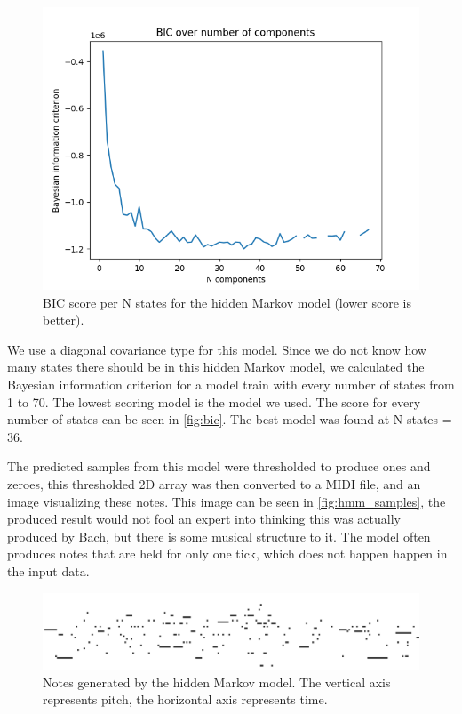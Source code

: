 \documentclass[11pt, twocolumn]{article}
\begin{document}
\begin{figure}[ht]
    \centering
    \includegraphics[width=\linewidth]{images/hmm_unfin_bic.png}
    \caption{BIC score per N states for the hidden Markov model (lower score is better).}
    \label{fig:bic}
\end{figure}

We use a diagonal covariance type for this model. Since we do not know how many states there should be in this hidden Markov model, we calculated the Bayesian information criterion for a model train with every number of states from 1 to 70. The lowest scoring model is the model we used. The score for every number of states can be seen in \autoref{fig:bic}. The best model was found at N states = 36.

The predicted samples from this model were thresholded to produce ones and zeroes, this thresholded 2D array was then converted to a MIDI file, and an image visualizing these notes. This image can be seen in \autoref{fig:hmm_samples}, the produced result would not fool an expert into thinking this was actually produced by Bach, but there is some musical structure to it. The model often produces notes that are held for only one tick, which does not happen happen in the input data.


\begin{figure}[ht]
    \centering
    \includegraphics[width=\linewidth]{images/hmm_samples.png}
    \caption{Notes generated by the hidden Markov model. The vertical axis represents pitch, the horizontal axis represents time.}
    \label{fig:hmm_samples}
\end{figure}
\end{document}
